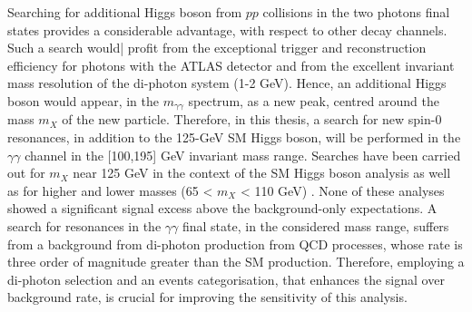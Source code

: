 \documentclass[a4paper, oneside, 11pt, openright]{book}
\begin{document}
		Searching for additional Higgs boson from $pp$ collisions in the two photons final states provides a considerable advantage, with respect to other decay channels. Such a search would| profit from the exceptional trigger and reconstruction efficiency for photons with the ATLAS detector and from the excellent invariant mass resolution of the di-photon system (1-2 GeV). Hence, an additional Higgs boson would appear, in the $m_{\gamma\gamma}$ spectrum, as a new peak, centred around the mass $m_X$ of the new particle. Therefore, in this thesis, a search for new spin-0 resonances, in addition to the 125-GeV SM Higgs boson, will be performed in the $\gamma\gamma$ channel in the [100,195] GeV invariant mass range. Searches have been carried out for $m_X$ near 125 GeV in the context of the SM Higgs boson analysis \cite{Lanyov_2014} as well as for higher \cite{2021136651}\cite{2017105} and lower masses (65 < $m_X$ < 110 GeV) \cite{ATLAS-CONF-2018-025}. None of these analyses showed a significant signal excess above the background-only expectations. A search for resonances in the $\gamma\gamma$ final state, in the considered mass range, suffers from a background from di-photon production from QCD processes, whose rate is three order of magnitude greater than the SM production. Therefore, employing a di-photon selection and an events categorisation, that enhances the signal over background rate, is crucial for improving the sensitivity of this analysis.
		
\end{document}
